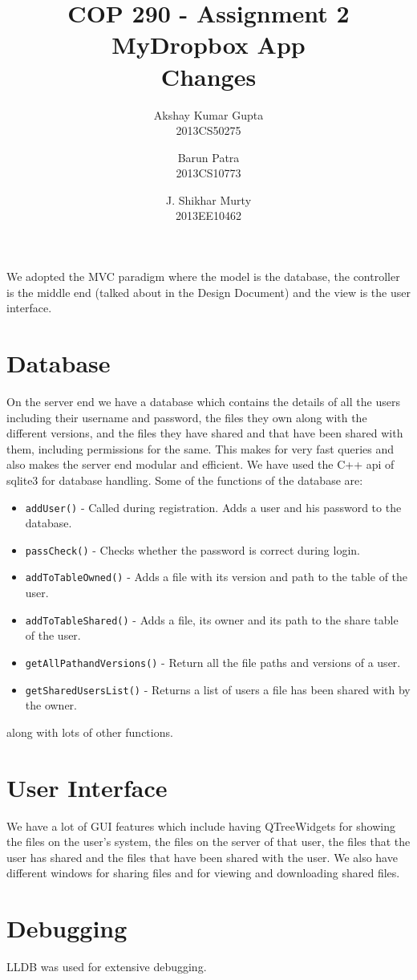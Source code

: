 \documentclass[]{article}
\newcommand{\ty}[1]{\texttt{#1}}
\begin{document}
\title{COP 290 - Assignment 2\\MyDropbox App \\Changes}
\author{Akshay Kumar Gupta\\ 2013CS50275 \and  Barun Patra\\{2013CS10773} \and J. Shikhar Murty\\{2013EE10462}}
\date{}
\maketitle
\noindent We adopted the MVC paradigm where the model is the database, the controller is the middle end (talked about in the Design Document) and the view is the user interface.
\section{Database}
On the server end we have a database which contains the details of all the users including their username and password, the files they own along with the different versions, and the files they have shared and that have been shared with them, including permissions for the same. This makes for very fast queries and also makes the server end modular and efficient. We have used  the C++ api of sqlite3 for database handling. Some of the functions of the database are:
\begin{itemize}
\item \ty{addUser()} - Called during registration. Adds a user and his password to the database.
\item \ty{passCheck()} - Checks whether the password is correct during login.
\item \ty{addToTableOwned()} - Adds a file with its version and path to the table of the user.
\item \ty{addToTableShared()} - Adds a file, its owner and its path to the share table of the user.
\item \ty{getAllPathandVersions()} - Return all the file paths and versions of a user.
\item \ty{getSharedUsersList()} - Returns a list of users a file has been shared with by the owner.
\end{itemize}
along with lots of other functions.
\section{User Interface}
We have a lot of GUI features which include having QTreeWidgets for showing the files on the user's system, the files on the server of that user, the files that the user has shared and the files that have been shared with the user. We also have different windows for sharing files and for viewing and downloading shared files.
\section{Debugging}
LLDB was used for extensive debugging.
\end{document}
